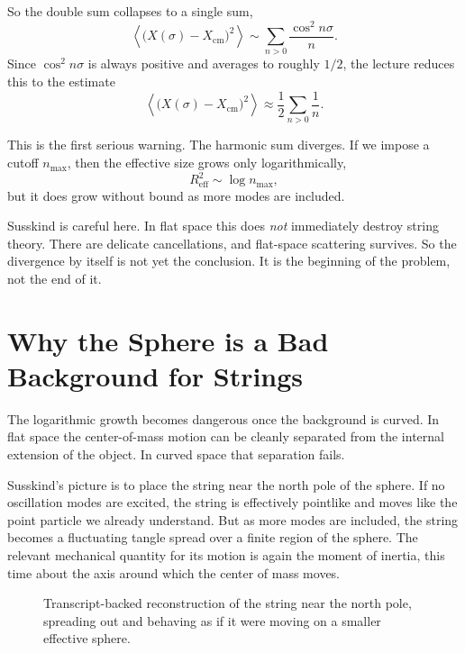 So the double sum collapses to a single sum,
\begin{equation}
\left\langle \bigl(X(\sigma)-X_{\mathrm{cm}}\bigr)^2 \right\rangle
\sim
\sum_{n>0}\frac{\cos^2 n\sigma}{n}.
\end{equation}
Since \(\cos^2 n\sigma\) is always positive and averages to roughly \(1/2\), the lecture reduces this to the estimate
\begin{equation}
\left\langle \bigl(X(\sigma)-X_{\mathrm{cm}}\bigr)^2 \right\rangle
\approx
\frac{1}{2}\sum_{n>0}\frac{1}{n}.
\end{equation}

This is the first serious warning. The harmonic sum diverges. If we impose a cutoff \(n_{\max}\), then the effective size grows only logarithmically,
\begin{equation}
R_{\mathrm{eff}}^2 \sim \log n_{\max},
\end{equation}
but it does grow without bound as more modes are included.

Susskind is careful here. In flat space this does \emph{not} immediately destroy string theory. There are delicate cancellations, and flat-space scattering survives. So the divergence by itself is not yet the conclusion. It is the beginning of the problem, not the end of it.

\section{Why the Sphere is a Bad Background for Strings}

The logarithmic growth becomes dangerous once the background is curved. In flat space the center-of-mass motion can be cleanly separated from the internal extension of the object. In curved space that separation fails.

Susskind's picture is to place the string near the north pole of the sphere. If no oscillation modes are excited, the string is effectively pointlike and moves like the point particle we already understand. But as more modes are included, the string becomes a fluctuating tangle spread over a finite region of the sphere. The relevant mechanical quantity for its motion is again the moment of inertia, this time about the axis around which the center of mass moves.

\begin{figure}[h]
\centering
{}
\caption{Transcript-backed reconstruction of the string near the north pole, spreading out and behaving as if it were moving on a smaller effective sphere.}
\end{figure}

